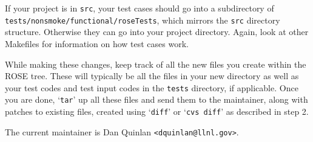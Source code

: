 \begin{enumerate}
If your project is in \verb|src|, your test cases should go into a subdirectory of \verb|tests/nonsmoke/functional/roseTests|, which mirrors the \verb|src| directory structure.  Otherwise they can go into your project directory.  Again, look at other Makefiles for information on how test cases work.

While making these changes, keep track of all the new files you create within the ROSE tree.  These will typically be all the files in your new directory as well as your test codes and test input codes in the \verb|tests| directory, if applicable.  Once you are done, `\verb|tar|' up all these files and send them to the maintainer, along with patches to existing files, created using `\verb|diff|' or `\verb|cvs diff|' as described in step 2.
\end{enumerate}

The current maintainer is Dan Quinlan \verb|<dquinlan@llnl.gov>|.

